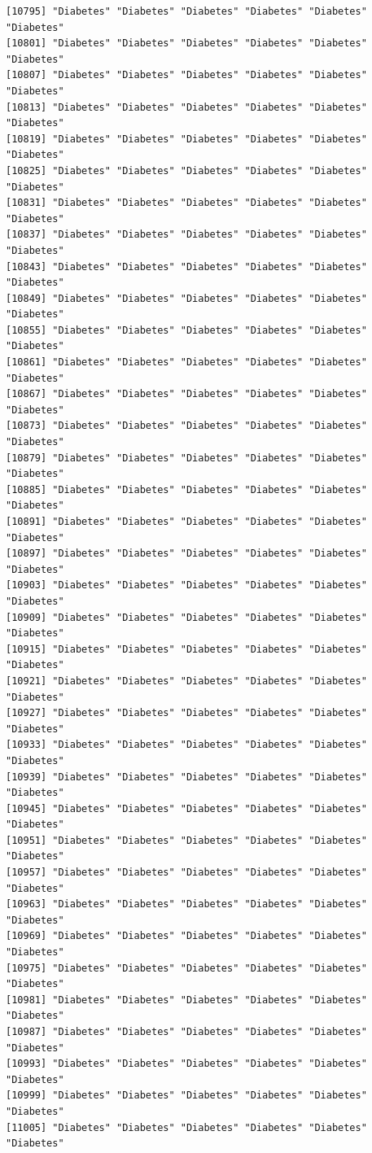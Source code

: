 \documentclass[
  letterpaper,
  DIV=11,
  numbers=noendperiod]{scrartcl}
\begin{document}
\begin{verbatim}
[10795] "Diabetes" "Diabetes" "Diabetes" "Diabetes" "Diabetes" "Diabetes"
[10801] "Diabetes" "Diabetes" "Diabetes" "Diabetes" "Diabetes" "Diabetes"
[10807] "Diabetes" "Diabetes" "Diabetes" "Diabetes" "Diabetes" "Diabetes"
[10813] "Diabetes" "Diabetes" "Diabetes" "Diabetes" "Diabetes" "Diabetes"
[10819] "Diabetes" "Diabetes" "Diabetes" "Diabetes" "Diabetes" "Diabetes"
[10825] "Diabetes" "Diabetes" "Diabetes" "Diabetes" "Diabetes" "Diabetes"
[10831] "Diabetes" "Diabetes" "Diabetes" "Diabetes" "Diabetes" "Diabetes"
[10837] "Diabetes" "Diabetes" "Diabetes" "Diabetes" "Diabetes" "Diabetes"
[10843] "Diabetes" "Diabetes" "Diabetes" "Diabetes" "Diabetes" "Diabetes"
[10849] "Diabetes" "Diabetes" "Diabetes" "Diabetes" "Diabetes" "Diabetes"
[10855] "Diabetes" "Diabetes" "Diabetes" "Diabetes" "Diabetes" "Diabetes"
[10861] "Diabetes" "Diabetes" "Diabetes" "Diabetes" "Diabetes" "Diabetes"
[10867] "Diabetes" "Diabetes" "Diabetes" "Diabetes" "Diabetes" "Diabetes"
[10873] "Diabetes" "Diabetes" "Diabetes" "Diabetes" "Diabetes" "Diabetes"
[10879] "Diabetes" "Diabetes" "Diabetes" "Diabetes" "Diabetes" "Diabetes"
[10885] "Diabetes" "Diabetes" "Diabetes" "Diabetes" "Diabetes" "Diabetes"
[10891] "Diabetes" "Diabetes" "Diabetes" "Diabetes" "Diabetes" "Diabetes"
[10897] "Diabetes" "Diabetes" "Diabetes" "Diabetes" "Diabetes" "Diabetes"
[10903] "Diabetes" "Diabetes" "Diabetes" "Diabetes" "Diabetes" "Diabetes"
[10909] "Diabetes" "Diabetes" "Diabetes" "Diabetes" "Diabetes" "Diabetes"
[10915] "Diabetes" "Diabetes" "Diabetes" "Diabetes" "Diabetes" "Diabetes"
[10921] "Diabetes" "Diabetes" "Diabetes" "Diabetes" "Diabetes" "Diabetes"
[10927] "Diabetes" "Diabetes" "Diabetes" "Diabetes" "Diabetes" "Diabetes"
[10933] "Diabetes" "Diabetes" "Diabetes" "Diabetes" "Diabetes" "Diabetes"
[10939] "Diabetes" "Diabetes" "Diabetes" "Diabetes" "Diabetes" "Diabetes"
[10945] "Diabetes" "Diabetes" "Diabetes" "Diabetes" "Diabetes" "Diabetes"
[10951] "Diabetes" "Diabetes" "Diabetes" "Diabetes" "Diabetes" "Diabetes"
[10957] "Diabetes" "Diabetes" "Diabetes" "Diabetes" "Diabetes" "Diabetes"
[10963] "Diabetes" "Diabetes" "Diabetes" "Diabetes" "Diabetes" "Diabetes"
[10969] "Diabetes" "Diabetes" "Diabetes" "Diabetes" "Diabetes" "Diabetes"
[10975] "Diabetes" "Diabetes" "Diabetes" "Diabetes" "Diabetes" "Diabetes"
[10981] "Diabetes" "Diabetes" "Diabetes" "Diabetes" "Diabetes" "Diabetes"
[10987] "Diabetes" "Diabetes" "Diabetes" "Diabetes" "Diabetes" "Diabetes"
[10993] "Diabetes" "Diabetes" "Diabetes" "Diabetes" "Diabetes" "Diabetes"
[10999] "Diabetes" "Diabetes" "Diabetes" "Diabetes" "Diabetes" "Diabetes"
[11005] "Diabetes" "Diabetes" "Diabetes" "Diabetes" "Diabetes" "Diabetes"

\end{verbatim}
\end{document}
